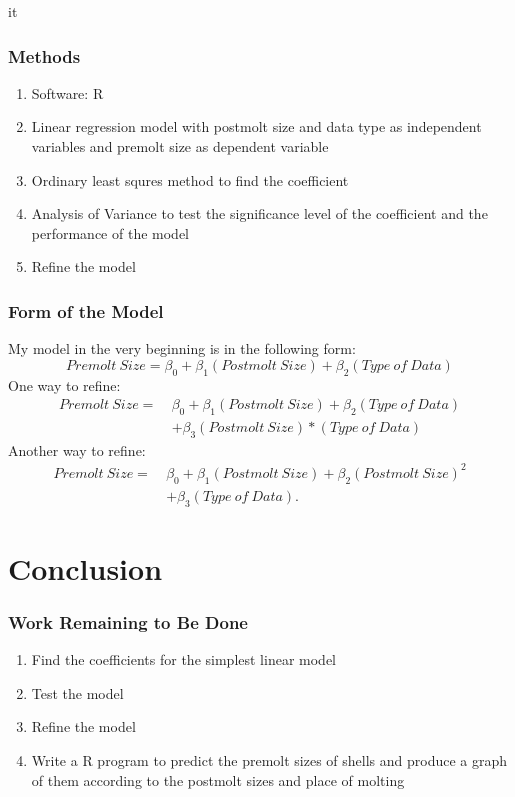 it\documentclass[compress,handout,10pt]{beamer}
\let\olditem\item
\renewcommand{\item}{\setlength{\itemsep}{0.5\baselineskip}\olditem}
\begin{document}
\begin{frame}
    \frametitle{Methods}
     \begin{enumerate}
         \item Software: R
         \item Linear regression model with postmolt size and data type as independent variables and premolt size as dependent variable
         \item Ordinary least squres method to find the coefficient
         \item Analysis of Variance to test the significance level of the coefficient and the performance of the model
         \item Refine the model
     \end{enumerate}
\end{frame}

\begin{frame}
    \frametitle{Form of the Model}
     My model in the very beginning is in the following form:
     $$Premolt~Size=\beta_0 + \beta_1 (Postmolt~Size) + \beta_2 (Type~of~Data)$$
     One way to refine:
     \begin{align*}
      Premolt~Size = ~&\beta_0 + \beta_1 (Postmolt~Size) + \beta_2 (Type~of~Data)\\
               & + \beta_3 (Postmolt~Size)*(Type~of~Data)
     \end{align*}
     Another way to refine:
     \begin{align*}
      Premolt~Size = ~&\beta_0 + \beta_1 (Postmolt~Size) + \beta_2 (Postmolt~Size)^2\\
               & + \beta_3 (Type~of~Data).
     \end{align*}
\end{frame}

\section{Conclusion}
\begin{frame}
    \frametitle{Work Remaining to Be Done}
     \begin{enumerate}
         \item Find the coefficients for the simplest linear model
         \item Test the model
         \item Refine the model
	 \item Write a R program to predict the premolt sizes of shells and produce a graph of them according to the postmolt sizes and place of molting 
     \end{enumerate}
\end{frame}
\end{document}
